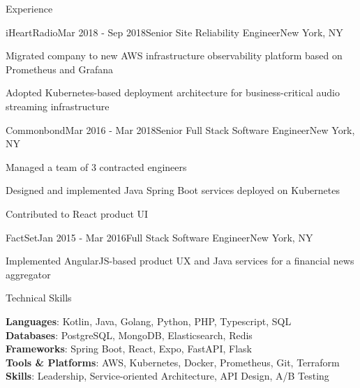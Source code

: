 \documentclass[
	10pt, %
]{resume} %
\begin{document}
\begin{rSection}{Experience}

    \begin{rSubsection}{iHeartRadio}{Mar 2018 - Sep 2018}{Senior Site Reliability Engineer}{New York, NY}
        \item Migrated company to new AWS infrastructure observability platform based on Prometheus and Grafana
        \item Adopted Kubernetes-based deployment architecture for business-critical audio streaming infrastructure
    \end{rSubsection}


    \begin{rSubsection}{Commonbond}{Mar 2016 - Mar 2018}{Senior Full Stack Software Engineer}{New York, NY}
        \item Managed a team of 3 contracted engineers
        \item Designed and implemented Java Spring Boot services deployed on Kubernetes
        \item Contributed to React product UI
    \end{rSubsection}
    

    \begin{rSubsection}{FactSet}{Jan 2015 - Mar 2016}{Full Stack Software Engineer}{New York, NY}
        \item Implemented AngularJS-based product UX and Java services for a financial news aggregator
    \end{rSubsection}

\end{rSection}

\begin{rSection}{Technical Skills}

    \textbf{Languages}: Kotlin, Java, Golang, Python, PHP, Typescript, SQL \\
    \textbf{Databases}: PostgreSQL, MongoDB, Elasticsearch, Redis \\
    \textbf{Frameworks}: Spring Boot, React, Expo, FastAPI, Flask \\
    \textbf{Tools \& Platforms}: AWS, Kubernetes, Docker, Prometheus, Git, Terraform \\
    \textbf{Skills}: Leadership, Service-oriented Architecture, API Design, A/B Testing \\

\end{rSection}
\end{document}
